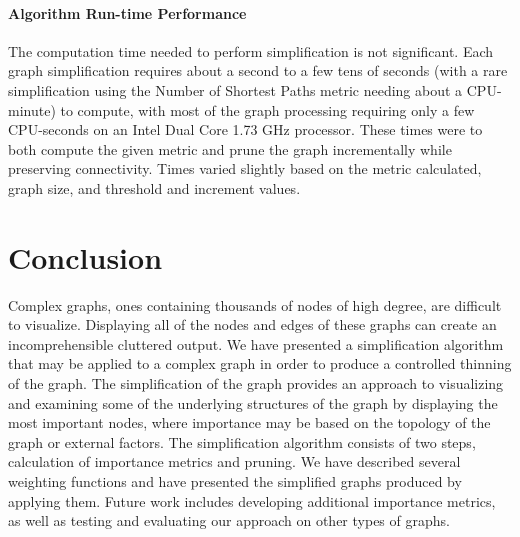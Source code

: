 \paragraph*{Algorithm Run-time Performance}
The computation time needed to perform simplification is not significant. Each graph simplification requires about a second to a few tens of seconds (with a rare simplification using the Number of Shortest Paths metric needing about a CPU-minute) to compute, with most of the graph processing requiring only a few CPU-seconds on an Intel Dual Core 1.73 GHz processor. These times were to both compute the given metric and prune the graph incrementally while preserving connectivity.  Times varied slightly based on the metric calculated, graph size, and threshold and increment values.


\section{Conclusion}
Complex graphs, ones containing thousands of nodes of high degree, are difficult to visualize. Displaying all of the nodes and edges of these graphs can create an incomprehensible cluttered output.  We have presented a simplification algorithm that may be applied to a complex graph in order to produce a controlled thinning of the graph. The simplification of the graph provides an approach to visualizing and examining some of the underlying structures of the graph by displaying the most important nodes, where importance may be based on the topology of the graph or external factors.  The simplification algorithm consists of two steps, calculation of importance metrics and pruning.  We have described several weighting functions and have presented the simplified graphs produced by applying them.  Future work includes developing additional importance metrics, as well as testing and evaluating our approach on other types of graphs.
